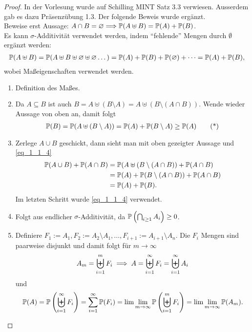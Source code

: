 \begin{proof}
	In der Vorlesung wurde auf Schilling MINT Satz 3.3 verwiesen. Ausserdem gab es dazu Präsenzübung 1.3. Der folgende Beweis wurde ergänzt.\\
	Beweise erst Aussage: $A\cap B = \varnothing \Longrightarrow \mathbb{P}(A \uplus B) = \mathbb{P}(A) + \mathbb{P}(B)$.\\ %
	Es kann $\sigma$-Additivität verwendet werden, indem ``fehlende'' Mengen durch $\emptyset$ ergänzt werden:
	\begin{align}
		\mathbb{P}(A \uplus B) = \mathbb{P}(A \uplus B \uplus \varnothing \uplus \varnothing \dots) = \mathbb{P}(A) + \mathbb{P}(B) + \mathbb{P}(\varnothing) + \dots = \mathbb{P}(A) + \mathbb{P}(B),\notag
	\end{align}
	wobei Maßeigenschaften verwendet werden.
	\begin{enumerate}
		\item Definition des Maßes.
		\item Da $A \subseteq B$ ist auch $B = A \uplus (B \setminus A) = A \uplus (B \setminus (A \cap B))$. Wende wieder Aussage von oben an, damit folgt
		\begin{align}
			\mathbb{P}(B) = \mathbb{P}(A \uplus (B \setminus A)) = \mathbb{P}(A) + \mathbb{P}(B \setminus A) \ge \mathbb{P}(A) \label{eq_1_1_4}\tag{*}
		\end{align}
		\item Zerlege $A \cup B$ geschickt, dann sieht man mit oben gezeigter Aussage und \eqref{eq_1_1_4}
		\begin{align}
			\mathbb{P}(A \cup B) + \mathbb{P}(A \cap B) &= \mathbb{P}(A \uplus (B \setminus (A \cap B)) + \mathbb{P}(A \cap B)\notag \\
			&= \mathbb{P}(A) + \mathbb{P}(B \setminus (A \cap B)) + \mathbb{P}(A \cap B)\notag\\
			&= \mathbb{P}(A)+\mathbb{P}(B).\notag	
		\end{align}
		Im letzten Schritt wurde \eqref{eq_1_1_4} verwendet.
		\item Folgt aus endlicher $\sigma$-Additivität, da $\mathbb{P}\left(\bigcap_{i\ge 1} A_i \right) \ge 0$.
		\item Definiere $F_1 := A_1, F_2 := A_2 \setminus A_1, \dots, F_{i+1} := A_{i+1}\setminus A_n$. Die $F_i$ Mengen sind paarweise disjunkt und damit folgt für $m \to \infty$
		\begin{align}
			A_m = \biguplus_{i=1}^{m} F_i \implies A = \biguplus_{i=1}^{\infty} F_i = \biguplus_{i=1}^{\infty} A_i\notag
		\end{align}
		und
		\begin{align}
			\mathbb{P}(A) = \mathbb{P}\left( \biguplus_{i=1}^{\infty} F_i \right) = \sum_{i=1}^{\infty} \mathbb{P}(F_i) = \lim\lim_{m \to \infty} \mathbb{P}\left( \biguplus_{i=1}^{m} F_i \right) = \lim\lim_{m\to \infty} \mathbb{P}(A_m). \notag
		\end{align}
	\end{enumerate}
\end{proof}

